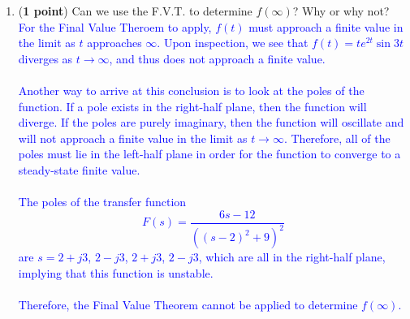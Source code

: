 \documentclass[]{article}
\begin{document}
\begin{enumerate}
\begin{enumerate}
        \item (\textbf{1 point}) Can we use the F.V.T. to determine $f(\infty)$? Why or why not?\\
        \textcolor{blue}{
        For the Final Value Theroem to apply, $f(t)$ must approach a finite value in the limit as $t$ approaches $\infty$. Upon inspection, we see that $f(t)=te^{2t}\sin{3t}$ diverges as $t \rightarrow \infty$, and thus does not approach a finite value.\\\\
        Another way to arrive at this conclusion is to look at the poles of the function. If a pole exists in the right-half plane, then the function will diverge. If the poles are purely imaginary, then the function will oscillate and will not approach a finite value in the limit as $t \rightarrow \infty$. Therefore, all of the poles must lie in the left-half plane in order for the function to converge to a steady-state finite value.\\\\
        The poles of the transfer function $$F(s)=\frac{6s-12}{((s-2)^2+9)^2}$$ are $s=2+j3$, $2-j3$, $2+j3$, $2-j3$, which are all in the right-half plane, implying that this function is unstable.\\\\
        Therefore, the Final Value Theorem cannot be applied to determine $f(\infty)$.
        }
    \end{enumerate}
    \vspace{0.4 cm}



\end{enumerate}
\end{document}
